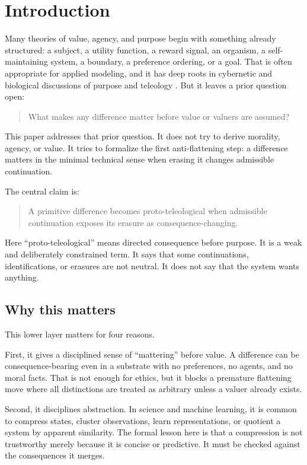 \documentclass[11pt]{article}
\begin{document}
\section{Introduction}

Many theories of value, agency, and purpose begin with something already
structured: a subject, a utility function, a reward signal, an organism, a
self-maintaining system, a boundary, a preference ordering, or a goal. That is
often appropriate for applied modeling, and it has deep roots in cybernetic and
biological discussions of purpose and teleology
\cite{rosenblueth1943behavior,mayr1961cause,monod1971chance}. But it leaves a
prior question open:

\begin{quote}
What makes any difference matter before value or valuers are assumed?
\end{quote}

This paper addresses that prior question. It does not try to derive morality,
agency, or value. It tries to formalize the first anti-flattening step: a
difference matters in the minimal technical sense when erasing it changes
admissible continuation.

The central claim is:

\begin{quote}
A primitive difference becomes proto-teleological when admissible continuation
exposes its erasure as consequence-changing.
\end{quote}

Here ``proto-teleological'' means directed consequence before purpose. It is a
weak and deliberately constrained term. It says that some continuations,
identifications, or erasures are not neutral. It does not say that the system
wants anything.

\subsection{Why this matters}

This lower layer matters for four reasons.

First, it gives a disciplined sense of ``mattering'' before value. A difference
can be consequence-bearing even in a substrate with no preferences, no agents,
and no moral facts. That is not enough for ethics, but it blocks a premature
flattening move where all distinctions are treated as arbitrary unless a valuer
already exists.

Second, it disciplines abstraction. In science and machine learning, it is
common to compress states, cluster observations, learn representations, or
quotient a system by apparent similarity. The formal lesson here is that a
compression is not trustworthy merely because it is concise or predictive. It
must be checked against the consequences it merges.
\end{document}
